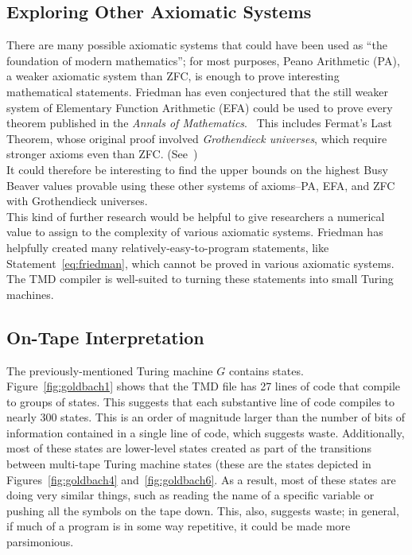 \subsection{Exploring Other Axiomatic Systems}

There are many possible axiomatic systems that could have been used as ``the foundation of modern mathematics''; for most purposes, Peano Arithmetic (PA), a weaker axiomatic system than ZFC, is enough to prove interesting mathematical statements. Friedman has even conjectured that the still weaker system of Elementary Function Arithmetic (EFA) could be used to prove every theorem published in the \emph{Annals of Mathematics}.~\cite{grandconjecture}
This includes Fermat's Last Theorem, whose original proof involved \emph{Grothendieck universes}, which require stronger axioms even than ZFC. (See~\cite{grothendieck}) \\ 

It could therefore be interesting to find the upper bounds on the highest Busy Beaver values provable using these other systems of axioms--PA, EFA, and ZFC with Grothendieck universes. \\

This kind of further research would be helpful to give researchers a numerical value to assign to the complexity of various axiomatic systems. Friedman has helpfully created many relatively-easy-to-program statements, like Statement~\ref{eq:friedman}, which cannot be proved in various axiomatic systems.~\cite{friedmanlist} The TMD compiler is well-suited to turning these statements into small Turing machines.

\subsection{On-Tape Interpretation}

The previously-mentioned Turing machine $G$ contains \gbstatenum states. Figure~\ref{fig:goldbach1} shows that the TMD file has 27 lines of code that compile to groups of states. This suggests that each substantive line of code compiles to nearly 300 states. This is an order of magnitude larger than the number of bits of information contained in a single line of code, which suggests waste. Additionally, most of these states are lower-level states created as part of the transitions between multi-tape Turing machine states (these are the states depicted in Figures~\ref{fig:goldbach4} and~\ref{fig:goldbach6}. As a result, most of these states are doing very similar things, such as reading the name of a specific variable or pushing all the symbols on the tape down. This, also, suggests waste; in general, if much of a program is in some way repetitive, it could be made more parsimonious. \\

